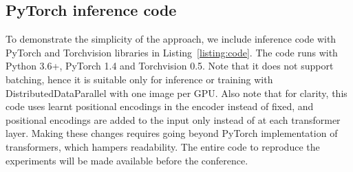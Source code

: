 \subsection{PyTorch inference code}

To demonstrate the simplicity of the approach, we include inference code
with PyTorch and Torchvision libraries in Listing~\ref{listing:code}.
The code runs with Python 3.6+, PyTorch 1.4 and Torchvision 0.5. Note that it does not support batching, hence it is suitable only for inference or training with DistributedDataParallel with one image per GPU. Also note that for clarity, this code uses learnt positional encodings in the encoder instead of fixed, and positional encodings are  added to the input only instead of at each transformer layer. Making these changes requires going beyond PyTorch implementation of transformers, which hampers readability. The entire code to reproduce the experiments will be made available before the conference.

\begin{listing}[ht]
\inputminted[fontsize=\scriptsize, linenos=true, python3=true]{python}{python/detr.py}
\caption{DETR PyTorch inference code. For clarity it uses learnt positional encodings in the encoder instead of fixed, and positional encodings are  added to the input only instead of at each transformer layer. Making these changes requires going beyond PyTorch implementation of transformers, which hampers readability. The entire code to reproduce the experiments will be made available before the conference.}
\label{listing:code}
\end{listing}















